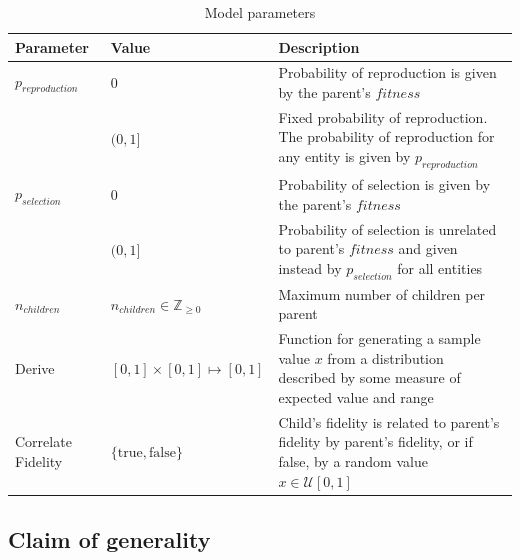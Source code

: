 \begin{table}
	\begin{center}
		\caption{Model parameters}\label{tbl:parameter_definitions}
		\begin{tabular}{@{}llp{8cm}@{}}
			\toprule
			Parameter          & Value                                & Description                                                                                                                   \\
			\midrule
			$p_{reproduction}$ & $0$                                  & Probability of reproduction is given by the parent's $fitness$                                                                \\
                & $(0,1]$                              & Fixed probability of reproduction. The probability of reproduction for any entity is given by $p_{reproduction}$              \\
			$p_{selection}$    & $0$                                  & Probability of selection is given by the parent's $fitness$                                                                   \\
                & $(0,1]$                              & Probability of selection is unrelated to parent's $fitness$ and given instead by $p_{selection}$ for all entities             \\
			$n_{children}$     & $n_{children}\in \mathbb{Z}_{\ge 0}$ & Maximum number of children per parent                                                                                         \\
			Derive             & $[0,1]\times[0,1]\mapsto[0,1]$       & Function for generating a sample value $x$ from a distribution described by some measure of expected value and range          \\
			Correlate Fidelity & $\{\mathrm{true}, \mathrm{false}\}$  & Child's fidelity is related to parent's fidelity by parent's fidelity, or if false, by a random value $x\in \mathcal{U}[0,1]$ \\
			\bottomrule
		\end{tabular}
	\end{center}
\end{table}

\subsection{Claim of generality}

